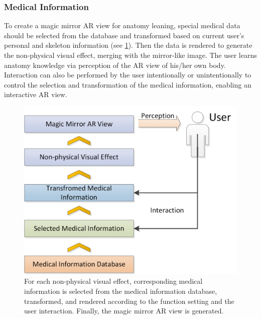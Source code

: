 {\subsubsection{Medical Information}
To create a magic mirror AR view for anatomy leaning, special medical data should be selected from the database and transformed based on current user's personal and skeleton information (see \figurename{\ref{fig:3-MMC:MedicalInfoFlow}}). Then the data is rendered to generate the non-physical visual effect, merging with the mirror-like image. The user learns anatomy knowledge via perception of the AR view of his/her own body. Interaction can also be performed by the user intentionally or unintentionally to control the  selection and transformation of the medical information, enabling an interactive AR view.
\begin{figure}
	\centering
	\includegraphics[width=0.7\linewidth]{figures/3-MMC/MedicalInfoFlow}
	\caption[Medical Information Flow]{For each non-physical visual effect, corresponding medical information is selected from the medical information database, transformed, and rendered according to the function setting and the user interaction. Finally, the magic mirror AR view is generated.}
	\label{fig:3-MMC:MedicalInfoFlow}
\end{figure}

}
